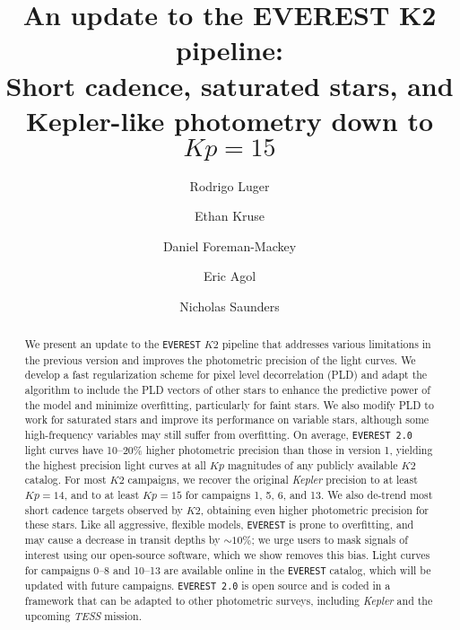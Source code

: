 \documentclass[]{aastex62}
\newcommand{\Kp}{\ensuremath{Kp}}
\newcommand{\edited}[1]{{\color{red} #1}}
\begin{document}
\title{An update to the EVEREST K2 pipeline:\\ Short cadence, saturated stars, and Kepler-like photometry down to $\Kp = 15$}

\author[0000-0002-0296-3826]{Rodrigo Luger}
%
\author{Ethan Kruse}
%
\author{Daniel Foreman-Mackey}
%
\author{Eric Agol}
%
\author{Nicholas Saunders}

\begin{abstract}
We present an update to the \texttt{EVEREST} $K2$ pipeline that addresses various limitations
in the previous version and improves the photometric precision of the light curves.
We develop a fast regularization scheme for pixel level decorrelation (PLD) and
adapt the algorithm to include the PLD vectors of other stars to enhance the predictive
power of the model and minimize overfitting, particularly for faint stars. We also modify PLD to work for saturated
stars and improve its performance on variable stars, \edited{although some high-frequency variables may still
suffer from overfitting}. On average, \texttt{EVEREST 2.0}
light curves have 10--20\% higher photometric precision than those in version 1,
yielding the highest precision light curves at all $\Kp$ magnitudes of any publicly available $K2$
catalog. For most $K2$ campaigns, we recover the original \emph{Kepler} precision to at least
$\Kp = 14$, and to at least $\Kp = 15$ for campaigns 1, 5, 6, \edited{and 13}. We also de-trend \edited{most} short
cadence targets observed by $K2$, obtaining even higher photometric precision for these stars.
\edited{Like all aggressive, flexible models, \texttt{EVEREST} is prone to overfitting,
and may cause a decrease in transit depths by ${\sim}10\%$; we urge users to mask
signals of interest using our open-source software, which we show removes this bias.}
Light curves for campaigns 0--8 \edited{and 10--13} are available online in the \texttt{EVEREST} catalog, which
will be updated with future campaigns.
\texttt{EVEREST 2.0} is open source and is coded in a framework that can be \edited{adapted}
to other photometric surveys, including \emph{Kepler} and the upcoming \emph{TESS} mission.\\[0.1in]
\end{abstract}
\end{document}
